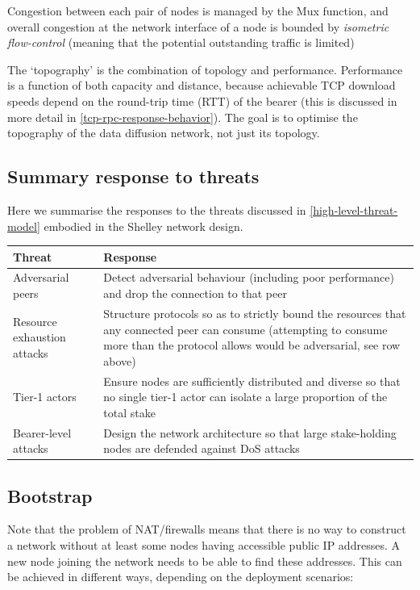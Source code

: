 \documentclass[11pt,a4paper]{article}
\begin{document}
Congestion between each pair of nodes is managed by the Mux function,
and overall congestion at the network interface of a node is bounded by
\emph{isometric flow-control} (meaning that the potential outstanding
traffic is limited)

The `topography' is the combination of topology and performance.
Performance is a function of both capacity and distance, because
achievable TCP download speeds depend on the round-trip time (RTT) of
the bearer (this is discussed in more detail in \cref{tcp-rpc-response-behavior}).
The goal is to optimise the topography of the data diffusion network,
not just its topology.

\subsection{Summary response to threats}
\label{summary-response-to-threats}

Here we summarise the responses to the threats discussed in
\cref{high-level-threat-model} embodied in the
Shelley network design.

\begin{longtable}[]{@{}ll@{}}
\toprule
\textbf{Threat} & \textbf{Response}\tabularnewline
\midrule
\endhead
Adversarial peers & Detect adversarial behaviour (including poor
performance) and drop the connection to that peer\tabularnewline
Resource exhaustion attacks & Structure protocols so as to strictly
bound the resources that any connected peer can consume (attempting to
consume more than the protocol allows would be adversarial, see row
above)\tabularnewline
Tier-1 actors & Ensure nodes are sufficiently distributed and diverse so
that no single tier-1 actor can isolate a large proportion of the total
stake\tabularnewline
Bearer-level attacks & Design the network architecture so that large
stake-holding nodes are defended against DoS attacks\tabularnewline
\bottomrule
\end{longtable}

\subsection{Bootstrap}
\label{bootstrap}

Note that the problem of NAT/firewalls means that there is no way to
construct a network without at least some nodes having accessible public
IP addresses. A new node joining the network needs to be able to find
these addresses. This can be achieved in different ways, depending on
the deployment scenarios:
\end{document}
